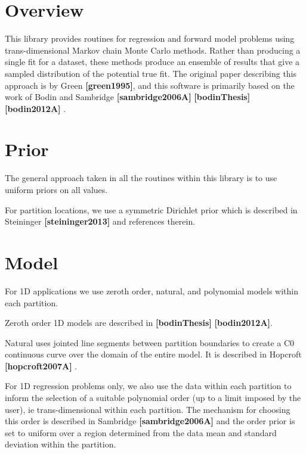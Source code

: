 \hypertarget{background_backgroundoverview}{}\section{Overview}\label{background_backgroundoverview}
This library provides routines for regression and forward model problems using trans-\/dimensional Markov chain Monte Carlo methods. Rather than producing a single fit for a dataset, these methods produce an ensemble of results that give a sampled distribution of the potential true fit. The original paper describing this approach is by Green {\bfseries [green1995]}, and this software is primarily based on the work of Bodin and Sambridge {\bfseries [sambridge2006A]} {\bfseries [bodin\+Thesis]} {\bfseries [bodin2012A]} .\hypertarget{background_backgroundprior}{}\section{Prior}\label{background_backgroundprior}
The general approach taken in all the routines within this library is to use uniform priors on all values.

For partition locations, we use a symmetric Dirichlet prior which is described in Steininger {\bfseries [steininger2013]} and references therein.\hypertarget{background_backgroundmodel}{}\section{Model}\label{background_backgroundmodel}
For 1D applications we use zeroth order, natural, and polynomial models within each partition.

Zeroth order 1D models are described in {\bfseries [bodin\+Thesis]} {\bfseries [bodin2012A]}.

Natural uses jointed line segments between partition boundaries to create a C0 continuous curve over the domain of the entire model. It is described in Hopcroft {\bfseries [hopcroft2007A]} .

For 1D regression problems only, we also use the data within each partition to inform the selection of a suitable polynomial order (up to a limit imposed by the user), ie trans-\/dimensional within each partition. The mechanism for choosing this order is described in Sambridge {\bfseries [sambridge2006A]} and the order prior is set to uniform over a region determined from the data mean and standard deviation within the partition.

